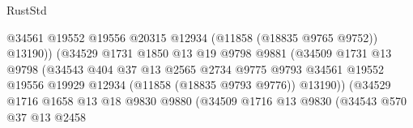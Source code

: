 \begin{lexlean}{RustStd}
\begin{coremodule}
                                              @34561
                                              @19552
                                              @19556
                                              @20315
                                              @12934
                                              (@11858 (@18835 @9765 @9752))
                                              @13190))
                                          (@34529
                                            @1731
                                            @1850
                                            @13
                                            @19
                                            @9798
                                            @9881
                                            (@34509
                                              @1731
                                              @13
                                              @9798
                                              (@34543
                                                @404
                                                @37
                                                @13
                                                @2565
                                                @2734
                                                @9775
                                                @9793
                                                @34561
                                                @19552
                                                @19556
                                                @19929
                                                @12934
                                                (@11858 (@18835 @9793 @9776))
                                                @13190))
                                            (@34529
                                              @1716
                                              @1658
                                              @13
                                              @18
                                              @9830
                                              @9880
                                              (@34509
                                                @1716
                                                @13
                                                @9830
                                                (@34543
                                                  @570
                                                  @37
                                                  @13
                                                  @2458

\end{coremodule}
\end{lexlean}
